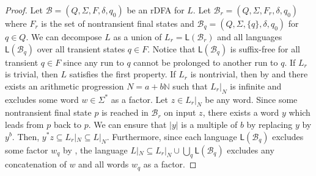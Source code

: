 \documentclass{article}\usepackage[a4paper,margin=20mm]{geometry}
\newcommand{\N}{\mathbb{N}}
\newcommand{\B}{\mathcal{B}}
\renewcommand{\L}{\mathsf{L}}
\begin{document}
\begin{proof}
	Let $\B = (Q,\Sigma,F,\delta,q_0)$ be an rDFA for $L$.
	Let $\B_r = (Q,\Sigma,F_r,\delta,q_0)$ where $F_r$ is the set of nontransient final states
	and $\B_q = (Q,\Sigma,\{q\},\delta,q_0)$ for $q \in Q$.
	We can decompose $L$ as a union of $L_r = \L(\B_r)$ and all languages $\L(\B_q)$
	over all transient states $q \in F$.
	Notice that $\L(\B_q)$ is suffix-free for all transient $q \in F$
	since any run to $q$ cannot be prolonged to another run to $q$.
	If $L_r$ is trivial, then $L$ satisfies the first property.
	If $L_r$ is nontrivial, then by  and 
	there exists an arithmetic progression $N = a + b\N$ such that
	$L_r|_N$ is infinite and excludes some word $w \in \Sigma^*$ as a factor.
	Let $z \in L_r|_N$ be any word. Since some nontransient final state $p$
	is reached in $\B_r$ on input $z$,
	there exists a word $y$ which leads from $p$ back to $p$.
	We can ensure that $|y|$ is a multiple of $b$ by replacing $y$ by $y^b$.
	Then, $y^*z \subseteq L_r|_N \subseteq L|_N$.
	Furthermore, since each language $\L(\B_q)$ excludes some factor $w_q$ by ,
	the language $L|_N \subseteq L_r|_N \cup \bigcup_q \L(\B_q)$
	excludes any concatenation of $w$ and all words $w_q$ as a factor.
\end{proof}
\end{document}
